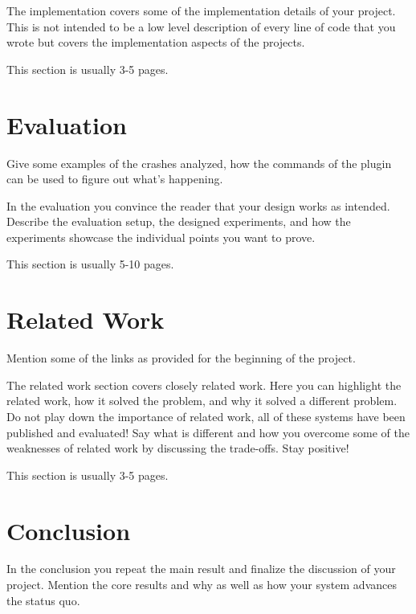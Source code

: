 \documentclass[a4paper,11pt,oneside]{report}
\begin{document}
The implementation covers some of the implementation details of your project.
This is not intended to be a low level description of every line of code that
you wrote but covers the implementation aspects of the projects.

This section is usually 3-5 pages.


\chapter{Evaluation}

Give some examples of the crashes analyzed, how the commands of the plugin
can be used to figure out what's happening.

In the evaluation you convince the reader that your design works as intended.
Describe the evaluation setup, the designed experiments, and how the
experiments showcase the individual points you want to prove.

This section is usually 5-10 pages.


\chapter{Related Work}

Mention some of the links as provided for the beginning of the project.

The related work section covers closely related work. Here you can highlight
the related work, how it solved the problem, and why it solved a different
problem. Do not play down the importance of related work, all of these
systems have been published and evaluated! Say what is different and how
you overcome some of the weaknesses of related work by discussing the 
trade-offs. Stay positive!

This section is usually 3-5 pages.


\chapter{Conclusion}

In the conclusion you repeat the main result and finalize the discussion of
your project. Mention the core results and why as well as how your system
advances the status quo.

\cleardoublepage
{}
{}
\printbibliography

%
%
\end{document}
